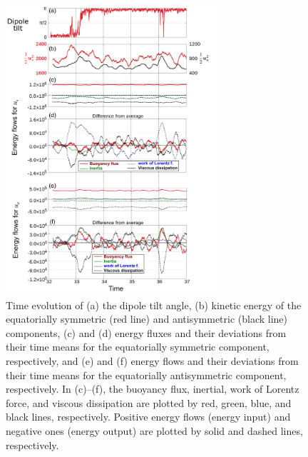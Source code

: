 \begin{figure}[ht]
\hspace*{\fill}
\includegraphics*[width=79mm]
{Figures/rev11_Energy_flux_evolution.png}
\hspace*{\fill}
\caption{
Time evolution of (a) the dipole tilt angle, (b) kinetic energy of the equatorially symmetric (red line) and antisymmetric (black line) components, (c) and (d) energy fluxes and their deviations from their time means for the equatorially symmetric component, respectively, and (e) and (f) energy flows and their deviations from their time means for the equatorially antisymmetric component, respectively.
In (c)--(f), the buoyancy flux, inertial, work of Lorentz force, and viscous dissipation are plotted by red, green, blue, and black lines, respectively.
Positive energy flows (energy input) and negative ones (energy output) are plotted by solid and dashed lines, respectively.
}
\label{fig:energy_flux_evolution_retry1_1}
\end{figure}